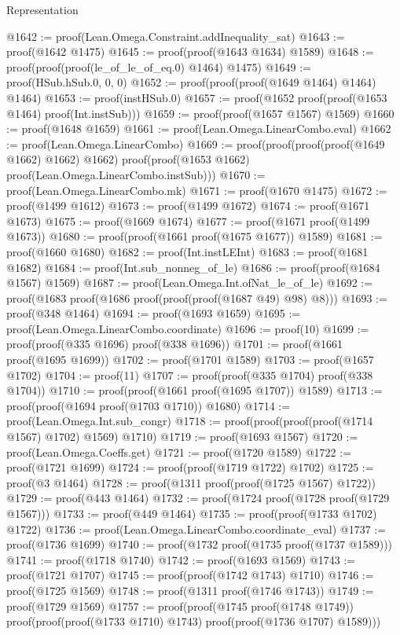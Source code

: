\begin{lexlean}{Representation}
\begin{coremodule}
@1642 := proof(Lean.Omega.Constraint.addInequality_sat)
@1643 := proof(@1642 @1475)
@1645 := proof(proof(@1643 @1634) @1589)
@1648 := proof(proof(proof(le_of_le_of_eq.{0}) @1464) @1475)
@1649 := proof(HSub.hSub.{0, 0, 0})
@1652 := proof(proof(proof(@1649 @1464) @1464) @1464)
@1653 := proof(instHSub.{0})
@1657 := proof(@1652 proof(proof(@1653 @1464) proof(Int.instSub)))
@1659 := proof(proof(@1657 @1567) @1569)
@1660 := proof(@1648 @1659)
@1661 := proof(Lean.Omega.LinearCombo.eval)
@1662 := proof(Lean.Omega.LinearCombo)
@1669 := proof(proof(proof(proof(@1649 @1662) @1662) @1662)
      proof(proof(@1653 @1662) proof(Lean.Omega.LinearCombo.instSub)))
@1670 := proof(Lean.Omega.LinearCombo.mk)
@1671 := proof(@1670 @1475)
@1672 := proof(@1499 @1612)
@1673 := proof(@1499 @1672)
@1674 := proof(@1671 @1673)
@1675 := proof(@1669 @1674)
@1677 := proof(@1671 proof(@1499 @1673))
@1680 := proof(proof(@1661 proof(@1675 @1677)) @1589)
@1681 := proof(@1660 @1680)
@1682 := proof(Int.instLEInt)
@1683 := proof(@1681 @1682)
@1684 := proof(Int.sub_nonneg_of_le)
@1686 := proof(proof(@1684 @1567) @1569)
@1687 := proof(Lean.Omega.Int.ofNat_le_of_le)
@1692 := proof(@1683 proof(@1686 proof(proof(proof(@1687 @49) @98) @8)))
@1693 := proof(@348 @1464)
@1694 := proof(@1693 @1659)
@1695 := proof(Lean.Omega.LinearCombo.coordinate)
@1696 := proof(10)
@1699 := proof(proof(@335 @1696) proof(@338 @1696))
@1701 := proof(@1661 proof(@1695 @1699))
@1702 := proof(@1701 @1589)
@1703 := proof(@1657 @1702)
@1704 := proof(11)
@1707 := proof(proof(@335 @1704) proof(@338 @1704))
@1710 := proof(proof(@1661 proof(@1695 @1707)) @1589)
@1713 := proof(proof(@1694 proof(@1703 @1710)) @1680)
@1714 := proof(Lean.Omega.Int.sub_congr)
@1718 := proof(proof(proof(proof(@1714 @1567) @1702) @1569) @1710)
@1719 := proof(@1693 @1567)
@1720 := proof(Lean.Omega.Coeffs.get)
@1721 := proof(@1720 @1589)
@1722 := proof(@1721 @1699)
@1724 := proof(proof(@1719 @1722) @1702)
@1725 := proof(@3 @1464)
@1728 := proof(@1311 proof(proof(@1725 @1567) @1722))
@1729 := proof(@443 @1464)
@1732 := proof(@1724 proof(@1728 proof(@1729 @1567)))
@1733 := proof(@449 @1464)
@1735 := proof(proof(@1733 @1702) @1722)
@1736 := proof(Lean.Omega.LinearCombo.coordinate_eval)
@1737 := proof(@1736 @1699)
@1740 := proof(@1732 proof(@1735 proof(@1737 @1589)))
@1741 := proof(@1718 @1740)
@1742 := proof(@1693 @1569)
@1743 := proof(@1721 @1707)
@1745 := proof(proof(@1742 @1743) @1710)
@1746 := proof(@1725 @1569)
@1748 := proof(@1311 proof(@1746 @1743))
@1749 := proof(@1729 @1569)
@1757 := proof(proof(@1745 proof(@1748 @1749))
      proof(proof(proof(@1733 @1710) @1743) proof(proof(@1736 @1707) @1589)))

\end{coremodule}
\end{lexlean}
